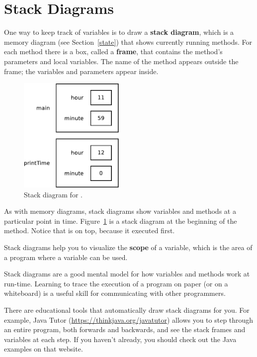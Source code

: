 \section{Stack Diagrams}
\label{stack}


One way to keep track of variables is to draw a {\bf stack diagram}, which is a memory diagram (see Section~\ref{state}) that shows currently running methods.
For each method there is a box, called a {\bf frame}, that contains the method's parameters and local variables.
The name of the method appears outside the frame; the variables and parameters appear inside.

\begin{figure}[!ht]
\begin{center}
\includegraphics[height=15em]{figs/stack1.pdf}
\caption{Stack diagram for .}
\label{fig.stack}
\end{center}
\end{figure}

As with memory diagrams, stack diagrams show variables and methods at a particular point in time.
Figure~\ref{fig.stack} is a stack diagram at the beginning of the  method.
Notice that  is on top, because it executed first.


Stack diagrams help you to visualize the {\bf scope} of a variable, which is the area of a program where a variable can be used.


Stack diagrams are a good mental model for how variables and methods work at run-time.
Learning to trace the execution of a program on paper (or on a whiteboard) is a useful skill for communicating with other programmers.

There are educational tools that automatically draw stack diagrams for you.
For example, Java Tutor (\url{https://thinkjava.org/javatutor}) allows you to step through an entire program, both forwards and backwards, and see the stack frames and variables at each step.
If you haven't already, you should check out the Java examples on that website.

